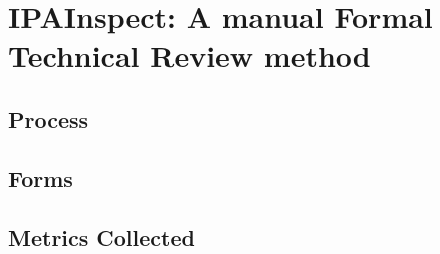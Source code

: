 
\chapter{IPAInspect: A manual Formal Technical Review method}
\label{sec:manual} 

\section{Process}

\section{Forms}

\section{Metrics Collected}
